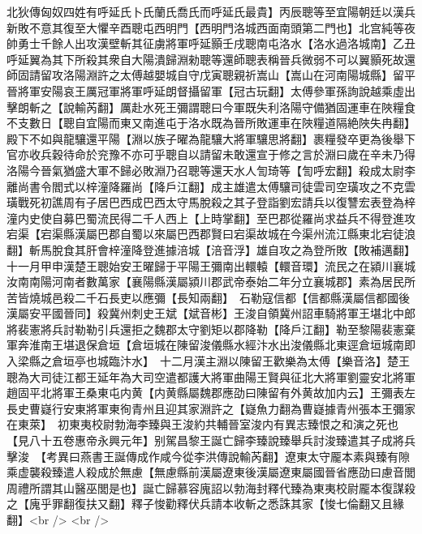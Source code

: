 北狄傳匈奴四姓有呼延氏卜氏蘭氏喬氏而呼延氏最貴】丙辰聰等至宜陽朝廷以漢兵新敗不意其復至大懼辛酉聰屯西明門【西明門洛城西面南頭第二門也】北宫純等夜帥勇士千餘人出攻漢壁斬其征虜將軍呼延顥壬戌聰南屯洛水【洛水過洛城南】乙丑呼延翼為其下所殺其衆自大陽潰歸淵勑聰等還師聰表稱晉兵微弱不可以翼顥死故還師固請留攻洛陽淵許之太傅越嬰城自守戊寅聰親祈嵩山【嵩山在河南陽城縣】留平晉將軍安陽哀王厲冠軍將軍呼延朗督攝留軍【冠古玩翻】太傅參軍孫詢說越乘虛出擊朗斬之【說輸芮翻】厲赴水死王彌謂聰曰今軍既失利洛陽守備猶固運車在陜糧食不支數日【聰自宜陽而東又南進屯于洛水既為晉所敗運車在陜糧道隔絶陜失冉翻】殿下不如與龍驤還平陽【淵以族子曜為龍驤大將軍驤思將翻】裹糧發卒更為後舉下官亦收兵穀待命於兖豫不亦可乎聰自以請留未敢還宣于修之言於淵曰歲在辛未乃得洛陽今晉氣猶盛大軍不歸必敗淵乃召聰等還天水人訇琦等【訇呼宏翻】殺成太尉李離尚書令閻式以梓潼降羅尚【降戶江翻】成主雄遣太傅驤司徒雲司空璜攻之不克雲璜戰死初譙周有子居巴西成巴西太守馬脫殺之其子登詣劉宏請兵以復讐宏表登為梓潼内史使自募巴蜀流民得二千人西上【上時掌翻】至巴郡從羅尚求益兵不得登進攻宕渠【宕渠縣漢屬巴郡自蜀以來屬巴西郡賢曰宕渠故城在今渠州流江縣東北宕徒浪翻】斬馬脫食其肝會梓潼降登進據涪城【涪音浮】雄自攻之為登所敗【敗補邁翻】　十一月甲申漢楚王聰始安王曜歸于平陽王彌南出轘轅【轘音環】流民之在潁川襄城汝南南陽河南者數萬家【襄陽縣漢屬潁川郡武帝泰始二年分立襄城郡】素為居民所苦皆燒城邑殺二千石長吏以應彌【長知兩翻】　石勒寇信都【信都縣漢屬信都國後漢屬安平國晉同】殺冀州刺史王斌【斌音彬】王浚自領冀州詔車騎將軍王堪北中郎將裴憲將兵討勒勒引兵還拒之魏郡太守劉矩以郡降勒【降戶江翻】勒至黎陽裴憲棄軍奔淮南王堪退保倉垣【倉垣城在陳留浚儀縣水經汴水出浚儀縣北東逕倉垣城南即入梁縣之倉垣亭也城臨汴水】　十二月漢主淵以陳留王歡樂為太傅【樂音洛】楚王聰為大司徒江都王延年為大司空遣都護大將軍曲陽王賢與征北大將軍劉靈安北將軍趙固平北將軍王桑東屯内黄【内黄縣屬魏郡應劭曰陳留有外黄故加内云】王彌表左長史曹嶷行安東將軍東徇青州且迎其家淵許之【嶷魚力翻為曹嶷據青州張本王彌家在東萊】　初東夷校尉勃海李臻與王浚約共輔晉室浚内有異志臻恨之和演之死也【見八十五卷惠帝永興元年】别駕昌黎王誕亡歸李臻說臻舉兵討浚臻遣其子成將兵擊浚　【考異曰燕書王誕傳成作咸今從李洪傳說輸芮翻】遼東太守龎本素與臻有隙乘虚襲殺臻遣人殺成於無慮【無慮縣前漢屬遼東後漢屬遼東屬國晉省應劭曰慮音閭周禮所謂其山醫巫閭是也】誕亡歸慕容廆詔以勃海封釋代臻為東夷校尉龎本復謀殺之【廆乎罪翻復扶又翻】釋子悛勸釋伏兵請本收斬之悉誅其家【悛七倫翻又且緣翻】<br />
<br />
